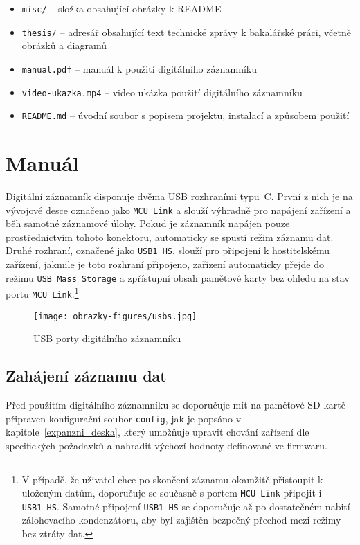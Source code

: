 \begin{itemize}
    \item \texttt{misc/} -- složka obsahující obrázky k README

    \item \texttt{thesis/} -- adresář obsahující text technické zprávy k bakalářské práci, včetně obrázků a diagramů
    
    \item \texttt{manual.pdf} -- manuál k použití digitálního záznamníku
    \item \texttt{video-ukazka.mp4} -- video ukázka použití digitálního záznamníku
    \item \texttt{README.md} -- úvodní soubor s popisem projektu, instalací a způsobem použití
\end{itemize}

\chapter{Manuál}
\label{manual_datalogger}

Digitální záznamník disponuje dvěma USB rozhraními typu~C. První z nich je na vývojové desce označeno jako \texttt{MCU Link} a slouží výhradně pro napájení zařízení a běh samotné záznamové úlohy. Pokud je záznamník napájen pouze prostřednictvím tohoto konektoru, automaticky se spustí režim záznamu dat. Druhé rozhraní, označené jako \texttt{USB1\_HS}, slouží pro připojení k hostitelskému zařízení, jakmile je toto rozhraní připojeno, zařízení automaticky přejde do režimu \texttt{USB Mass Storage} a zpřístupní obsah paměťové karty bez ohledu na stav portu \texttt{MCU Link}.\footnote{V případě, že uživatel chce po skončení záznamu okamžitě přistoupit k uloženým datům, doporučuje se současně s portem \texttt{MCU Link} připojit i \texttt{USB1\_HS}. Samotné připojení \texttt{USB1\_HS} se doporučuje až po dostatečném nabití zálohovacího kondenzátoru, aby byl zajištěn bezpečný přechod mezi režimy bez ztráty dat.}

\begin{figure}[h]
    \centering
    \texttt{[image: obrazky-figures/usbs.jpg]}
    
    \caption{USB porty digitálního záznamníku}
    \label{fig:usb-ports}
\end{figure}


\section{Zahájení záznamu dat}
Před použitím digitálního záznamníku se doporučuje mít na paměťové SD kartě připraven konfigurační soubor \texttt{config}, jak je popsáno v kapitole~\ref{expanzni_deska}, který umožňuje upravit chování zařízení dle specifických požadavků a nahradit výchozí hodnoty definované ve firmwaru.

